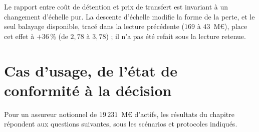 Le rapport entre coût de détention et prix de transfert est invariant à un changement d'échelle pur. La descente d'échelle modifie la forme de la perte, et le seul balayage disponible, tracé dans la lecture précédente ($169$ à $43$~M\euro), place cet effet à $+36\,\%$ (de $2{,}78$ à $3{,}78$) ; il n'a pas été refait sous la lecture retenue.

\section{Cas d'usage, de l'état de conformité à la décision}
\label{sec:cas-usage-chiffre}

Pour un assureur notionnel de $19\,231$~M\euro{} d'actifs, les résultats du chapitre répondent aux
questions suivantes, sous les scénarios et protocoles indiqués.

